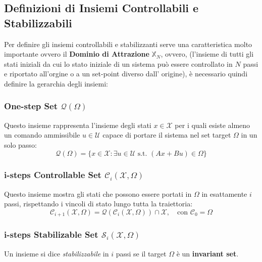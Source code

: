 \subsection{Definizioni di Insiemi Controllabili e Stabilizzabili}
\label{DominioAttrazione}
Per definire gli insiemi controllabili e stabilizzanti serve una caratteristica molto importante ovvero il  \textbf{Dominio di Attrazione} $\mathbb{X}_N$, ovvero, (l'insieme di tutti gli stati iniziali da cui lo stato iniziale di un sistema può essere controllato in $N$ passi e riportato all'orgine o a un set-point diverso dall' origine), è necessario quindi definire la gerarchia degli insiemi:

\subsubsection{One-step Set $\mathcal{Q}(\Omega)$}
Questo insieme rappresenta l'insieme degli stati $x \in \mathcal{X}$ per i quali esiste almeno un comando ammissibile $u \in \mathcal{U}$ capace di portare il sistema nel set target $\Omega$ in un solo passo:
\begin{equation}
	\mathcal{Q}(\Omega) = \{x \in \mathcal{X} : \exists u \in \mathcal{U} \text{ s.t. } (Ax+Bu) \in \Omega\}
\end{equation}

\subsubsection{i-steps Controllable Set $\mathcal{C}_i(\mathcal{X}, \Omega)$}
Questo insieme mostra gli stati che possono essere portati in $\Omega$ in esattamente $i$ passi, rispettando i vincoli di stato lungo tutta la traiettoria:
\begin{equation}
	\mathcal{C}_{i+1}(\mathcal{X}, \Omega) = \mathcal{Q}(\mathcal{C}_i(\mathcal{X}, \Omega)) \cap \mathcal{X}, \quad \text{con } \mathcal{C}_0 = \Omega
\end{equation}

\subsubsection{i-steps Stabilizable Set $\mathcal{S}_i(\mathcal{X}, \Omega)$}
Un insieme si dice \textit{stabilizzabile} in $i$ passi se il target $\Omega$ è un \textbf{invariant set}. 

